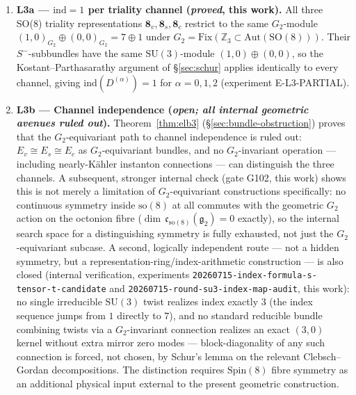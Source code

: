 \documentclass[12pt,a4paper]{article}
\newcommand{\ind}{\mathrm{ind}}
\newcommand{\ZZ}{\mathbb{Z}}
\begin{document}
\begin{enumerate}
\item \textbf{L3a --- $\ind=1$ per triality channel (\emph{proved}, this work).}
  All three SO(8) triality representations $\mathbf{8}_v, \mathbf{8}_s, \mathbf{8}_c$
  restrict to the same $G_2$-module $(1,0)_{G_2}\oplus(0,0)_{G_2}=7\oplus 1$ under
  $G_2=\mathrm{Fix}(\ZZ_3\subset\mathrm{Aut}(\mathrm{SO}(8)))$.
  Their $S^-$-subbundles have the same $\mathrm{SU}(3)$-module $(1,0)\oplus(0,0)$,
  so the Kostant--Parthasarathy argument of \S\ref{sec:schur} applies identically
  to every channel, giving $\ind(D^{(\alpha)})=1$ for $\alpha=0,1,2$
  (experiment E-L3-PARTIAL).

\item \textbf{L3b --- Channel independence (\emph{open; all internal geometric avenues
  ruled out}).} Theorem~\ref{thm:elb3} (\S\ref{sec:bundle-obstruction}) proves that the
  $G_2$-equivariant path to channel independence is ruled out: $E_v\cong E_s\cong E_c$ as
  $G_2$-equivariant bundles, and no $G_2$-invariant operation --- including nearly-K\"ahler
  instanton connections --- can distinguish the three channels. A subsequent, stronger
  internal check (gate G102, this work) shows this is not merely a limitation of
  $G_2$-equivariant constructions specifically: no continuous symmetry inside
  $\mathrm{so}(8)$ at all commutes with the geometric $G_2$ action on the octonion fibre
  ($\dim\,\mathfrak{c}_{\mathrm{so}(8)}(\mathfrak{g}_2)=0$ exactly), so the internal search
  space for a distinguishing symmetry is fully exhausted, not just the $G_2$-equivariant
  subcase. A second, logically independent route --- not a hidden symmetry, but a
  representation-ring/index-arithmetic construction --- is also closed (internal
  verification, experiments \texttt{20260715-index-formula-s-tensor-t-candidate} and
  \texttt{20260715-round-su3-index-map-audit}, this work): no single irreducible
  $\mathrm{SU}(3)$ twist realizes index exactly $3$ (the index sequence jumps from $1$
  directly to $7$), and no standard reducible bundle combining twists via a
  $G_2$-invariant connection realizes an exact $(3,0)$ kernel without extra mirror zero
  modes --- block-diagonality of any such connection is forced, not chosen, by Schur's
  lemma on the relevant Clebsch--Gordan decompositions. The distinction requires
  $\mathrm{Spin}(8)$ fibre symmetry as an additional
  physical input external to the present geometric construction.


\end{enumerate}
\end{document}
